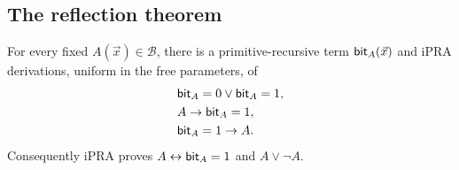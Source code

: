 \subsection{The reflection theorem}

\begin{theorem}
\label{thm:bounded-reflection}
For every fixed \(A(\vec x)\in\mathcal B\), there is a primitive-recursive term \(\mathsf{bit}_A(\vec x)\) and iPRA derivations, uniform in the free parameters, of
\[
\begin{aligned}
&\mathsf{bit}_A=0\vee\mathsf{bit}_A=1,\\
&A\to\mathsf{bit}_A=1,\\
&\mathsf{bit}_A=1\to A.
\end{aligned}
\]
Consequently iPRA proves \(A\leftrightarrow\mathsf{bit}_A=1\) and \(A\vee\neg A\).
\end{theorem}

